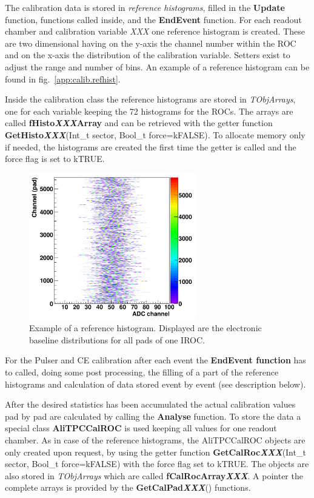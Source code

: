 The calibration data is stored in {\em reference histograms}, filled in the {\bf Update} function, functions called inside, and the {\bf EndEvent} function. For each readout chamber and calibration variable {\it XXX} one reference histogram is created. These are two dimensional having on the y-axis the channel number within the ROC and on the x-axis the distribution of the calibration variable. Setters exist to adjust the range and number of bins. An example of a reference histogram can be found in fig.\ \ref{app:calib.refhist}.

Inside the calibration class the reference histograms are stored in {\em TObjArrays}, one for each variable keeping the 72 histograms for the ROCs. The arrays are called {\bf fHisto{\it XXX}Array} and can be retrieved with the getter function {\bf GetHisto{\it XXX}}(Int\_t sector, Bool\_t force=kFALSE). To allocate memory only if needed, the histograms are created the first time the getter is called and the force flag is set to kTRUE.

\begin{figure}
  \centering
  \includegraphics[width=7.3cm]{images/RefHist}
  \caption{Example of a reference histogram. Displayed are the electronic baseline distributions for all pads of one IROC.}
  \label{fig:calib.refhist}
\end{figure}

For the Pulser and CE calibration after each event the {\bf EndEvent function} has to called, doing some post processing, the filling of a part of the reference histograms and calculation of data stored event by event (see description below).

After the desired statistics has been accumulated the actual calibration values pad by pad are calculated by calling the {\bf Analyse} function. To store the data a special class {\bf AliTPCCalROC} is used keeping all values for one readout chamber. As in case of the reference histograms, the AliTPCCalROC objects are only created upon request, by using the getter function {\bf GetCalRoc{\it XXX}}(Int\_t sector, Bool\_t force=kFALSE) with the force flag set to kTRUE. The objects are also stored in {\em TObjArrays} which are called {\bf fCalRocArray{\it XXX}}. A pointer the complete arrays is provided by the {\bf GetCalPad{\it XXX}}() functions.

